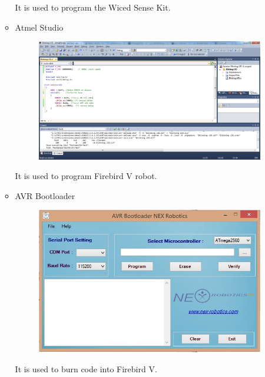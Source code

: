 \documentclass[a4paper,12pt,oneside]{book}
\begin{document}
\begin{itemize}
\begin{itemize}
	    It is used to program the Wiced Sense Kit.
	\\
   \item Atmel Studio 
            \begin{figure}[h]
        \centering
    	\includegraphics[scale=0.3]{atmel.jpg}
	    \end{figure}
	    
	    It is used to program Firebird V robot.
	    
	    \newpage 
	     \item AVR Bootloader
	     \begin{figure}[h]
        \centering
    	\includegraphics[scale=0.4]{avr.JPG}
	    \end{figure}
  
  It is used to burn code into Firebird V.
  

\end{itemize}
\end{itemize}
\end{document}

